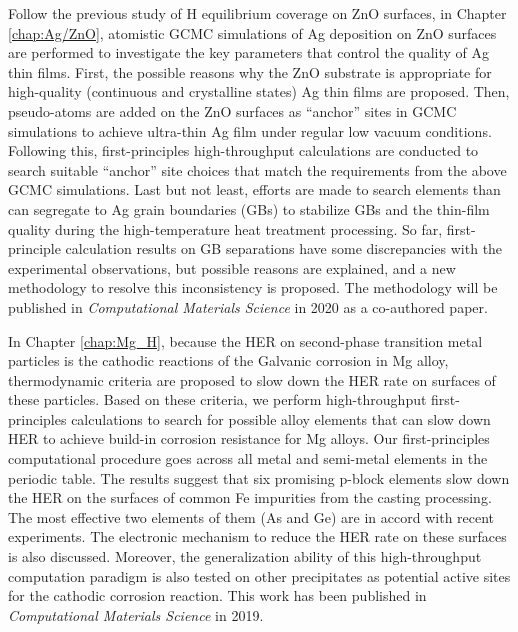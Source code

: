 Follow the previous study of H equilibrium coverage on ZnO surfaces, in Chapter \ref{chap:Ag/ZnO}, atomistic \acf{GCMC} simulations of Ag deposition on ZnO surfaces are performed to investigate the key parameters that control the quality of Ag thin films. First, the possible reasons why the ZnO substrate is appropriate for high-quality (continuous and crystalline states) Ag thin films are proposed. Then, pseudo-atoms are added on the ZnO surfaces as ``anchor'' sites in GCMC simulations to achieve ultra-thin Ag film under regular low vacuum conditions. Following this, first-principles high-throughput calculations are conducted to search suitable ``anchor'' site choices that match the requirements from the above GCMC simulations. Last but not least, efforts are made to search elements than can segregate to Ag grain boundaries (GBs) to stabilize GBs and the thin-film quality during the high-temperature heat treatment processing. So far, first-principle calculation results on GB separations have some discrepancies with the experimental observations, but possible reasons are explained, and a new methodology to resolve this inconsistency is proposed. The methodology will be published in \textit{Computational Materials Science} in 2020 as a co-authored paper. \cite{yang2020grain}

In Chapter \ref{chap:Mg_H}, because the \acf{HER} on second-phase transition metal particles is the cathodic reactions of the Galvanic corrosion in Mg alloy, thermodynamic criteria are proposed to slow down the HER rate on surfaces of these particles. Based on these criteria, we perform high-throughput first-principles calculations to search for possible alloy elements that can slow down HER to achieve build-in corrosion resistance for Mg alloys.  Our first-principles computational procedure goes across all metal and semi-metal elements in the periodic table. The results suggest that six promising p-block elements slow down the HER on the surfaces of common Fe impurities from the casting processing. The most effective two elements of them (As and Ge) are in accord with recent experiments. The electronic mechanism to reduce the HER rate on these surfaces is also discussed. Moreover, the generalization ability of this high-throughput computation paradigm is also tested on other precipitates as potential active sites for the cathodic corrosion reaction. This work has been published in \textit{Computational Materials Science} in 2019. \cite{zhang2019first}

